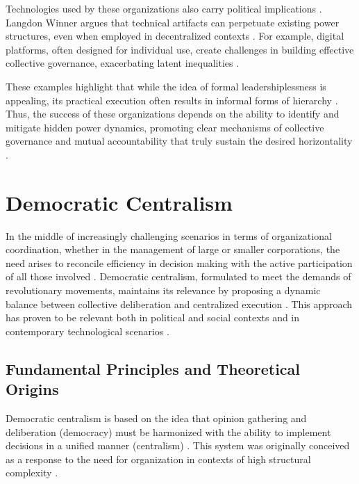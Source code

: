 Technologies used by these organizations also carry political implications
\cite{DoArtifactsHavePolitics, Democraciaeoscodigosinvisiveis}. Langdon Winner
argues that technical artifacts can perpetuate existing power structures, even
when employed in decentralized contexts \cite{DoArtifactsHavePolitics}. For
example, digital platforms, often designed for individual use, create challenges
in building effective collective governance, exacerbating latent inequalities
\cite{DoArtifactsHavePolitics, BigTech}.

These examples highlight that while the idea of formal leadershiplessness is
appealing, its practical execution often results in informal forms of hierarchy
\cite{EverydayRevolutions, SocialMediaTeamsAsDigitalVanguards}. Thus, the
success of these organizations depends on the ability to identify and mitigate
hidden power dynamics, promoting clear mechanisms of collective governance and
mutual accountability that truly sustain the desired horizontality
\cite{Colbac}.

\section{Democratic Centralism}
\label{sec:democratic_centralism}

In the middle of increasingly challenging scenarios in terms of organizational
coordination, whether in the management of large or smaller corporations, the need arises to
reconcile efficiency in decision making with the active participation of all
those involved \cite{DoArtifactsHavePolitics}. Democratic centralism, formulated
to meet the demands of revolutionary movements, maintains its relevance by
proposing a dynamic balance between collective deliberation and centralized
execution \cite{EstatutosDoPCP}. This approach has proven to be relevant both in
political and social contexts and in contemporary technological scenarios
\cite{Colbac}.

\subsection{Fundamental Principles and Theoretical Origins}
\label{subsec:fundamental_principles_origins}

Democratic centralism is based on the idea that opinion gathering and
deliberation (democracy) must be harmonized with the ability to implement
decisions in a unified manner (centralism)
\cite{ACenturyofDemocraticCentralism}. This system was originally conceived as a
response to the need for organization in contexts of high structural complexity
\cite{StillaCenturyoftheChineseModel}.

